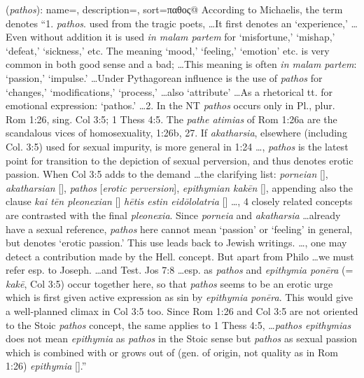 \item[Erotic perversion,]

(\textit{pathos}):
{
    name=,
    description={},
    sort=παθος@
}
According to Michaelis, the term denotes ``1. \emph{pathos}. used from the tragic poets, \ldots It first denotes an `experience,' \ldots Even without addition it is used \emph{in malam partem} for `misfortune,' `mishap,' `defeat,' `sickness,' etc. The meaning `mood,' `feeling,' `emotion' etc. is very common in both good sense and a bad; \ldots This meaning is often \emph{in malam partem}: `passion,' `impulse.' \ldots Under Pythagorean influence is the use of \emph{pathos} for `changes,' `modifications,' `process,' \ldots also `attribute' \ldots As a rhetorical tt. for emotional expression: `pathos.' \ldots 2. In the NT \emph{pathos} occurs only in Pl., plur. Rom 1:26, sing. Col 3:5; 1 Thess 4:5. The \emph{pathe atimias} of Rom 1:26a are the scandalous vices of homosexuality, 1:26b, 27. If \emph{akatharsia}, elsewhere (including Col. 3:5) used for sexual impurity, is more general in 1:24 \ldots, \emph{pathos} is the latest point for transition to the depiction of sexual perversion, and thus denotes erotic passion. When Col 3:5 adds to the demand \ldots the clarifying list: \emph{porneian} [], \emph{akatharsian} [], \emph{pathos} [\emph{erotic perversion}], \emph{epithymian kakēn} [], appending also the clause \emph{kai tēn pleonexian} [] \emph{hētis estin eidōlolatria} [] \ldots, 4 closely related concepts are contrasted with the final \emph{pleonexia}. Since \emph{porneia} and \emph{akatharsia} \ldots already have a sexual reference, \emph{pathos} here cannot mean `passion' or `feeling' in general, but denotes `erotic passion.' This use leads back to Jewish writings. \ldots, one may detect a contribution made by the Hell. concept. But apart from Philo \ldots we must refer esp. to Joseph. \ldots and Test. Jos 7:8 \ldots esp. as \emph{pathos} and \emph{epithymia ponēra} (= \emph{kakē}, Col 3:5) occur together here, so that \emph{pathos} seems to be an erotic urge which is first given active expression as sin by \emph{epithymia ponēra}. This would give a well-planned climax in Col 3:5 too. Since Rom 1:26 and Col 3:5 are not oriented to the Stoic \emph{pathos} concept, the same applies to 1 Thess 4:5, \ldots \emph{pathos epithymias} does not mean \emph{epithymia} as \emph{pathos} in the Stoic sense but \emph{pathos} as sexual passion which is combined with or grows out of (gen. of origin, not quality as in Rom 1:26) \emph{epithymia} [].''
